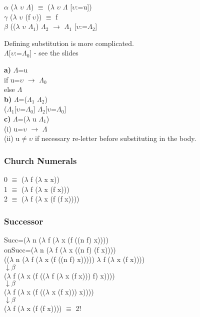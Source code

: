 \documentclass{article}
\begin{document}
\doublespacing
\begin{flushleft}
$\alpha$ ($\lambda$ $\upsilon$ $\Lambda$) $\equiv$ ($\lambda$ $\upsilon$ $\Lambda$ [$\upsilon$:=u])\\
$\gamma$ ($\lambda$ $\upsilon$ (f $\upsilon$)) $\equiv$ f\\
$\beta$ (($\lambda$ $\upsilon$ ${\Lambda}_{1}$) ${\Lambda}_{2}$ $\rightarrow$ ${\Lambda}_{1}$ [$\upsilon$:=${\Lambda}_{2}$]
\end{flushleft}

\begin{flushleft}
Defining substitution is more complicated.\\
$\Lambda$[$\upsilon$:=${\Lambda}_{0}$] - see the slides 
\end{flushleft}

\begin{flushleft}
\textbf{a)} $\Lambda$=u\\
if u=$\upsilon$ $\rightarrow$ ${\Lambda}_{0}$ \\
else $\Lambda$\\
\textbf{b)} $\Lambda$=(${\Lambda}_{1}$ ${\Lambda}_{2}$)\\
(${\Lambda}_{1}$[$\upsilon$=${\Lambda}_{0}$] ${\Lambda}_{2}$[$\upsilon$=${\Lambda}_{0}$]\\
\textbf{c)} $\Lambda$=($\lambda$ u ${\Lambda}_{1}$)\\
(i) u=$\upsilon$ $\rightarrow$ $\Lambda$\\
(ii) u$\neq\upsilon$ if necessary re-letter before substituting in the body.
\end{flushleft}

\subsubsection*{Church Numerals}
\begin{flushleft}
0 $\equiv$ ($\lambda$ f ($\lambda$ x x))\\
1 $\equiv$ ($\lambda$ f ($\lambda$ x (f x)))\\
2 $\equiv$ ($\lambda$ f ($\lambda$ x (f (f x))))
\end{flushleft}

\subsubsection*{Successor}
\begin{flushleft}
Succ=($\lambda$ n ($\lambda$ f ($\lambda$ x (f ((n f) x))))\\
onSucc=($\lambda$ n ($\lambda$ f ($\lambda$ x ((n f) (f x))))\\
(($\lambda$ n ($\lambda$ f ($\lambda$ x (f ((n f) x))))) $\lambda$ f ($\lambda$ x (f x))))\\
$\downarrow \beta$\\
($\lambda$ f ($\lambda$ x (f (($\lambda$ f ($\lambda$ x (f x))) f) x))))\\
$\downarrow \beta$\\
($\lambda$ f ($\lambda$ x (f (($\lambda$ x (f x))) x))))\\
$\downarrow \beta$\\
($\lambda$ f ($\lambda$ x (f (f x)))) $\equiv$ 2!
\end{flushleft}
\end{document}
